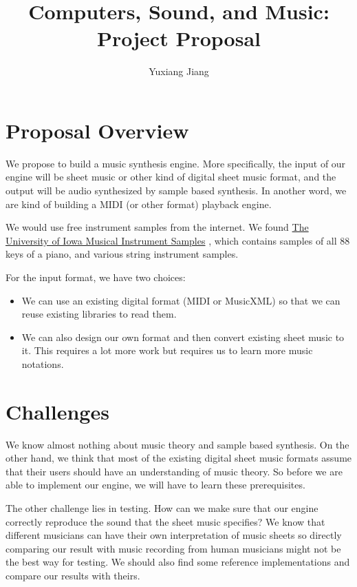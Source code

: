 \documentclass{article}
\begin{document}
\title{Computers, Sound, and Music: Project Proposal}
\author[]{Yuxiang Jiang}
\maketitle

\section{Proposal Overview}

We propose to build a music synthesis engine. More specifically, the input of
our engine will be sheet music or other kind of digital sheet music format,
and the output will be audio synthesized by sample based
synthesis. In another word, we are kind of building a MIDI (or other format)
playback engine.

We would use free instrument samples from the internet. We found
\href{http://theremin.music.uiowa.edu/MIS.html}
  {The University of Iowa Musical Instrument Samples}%
, which
contains samples of all 88 keys of a piano, and various string
instrument samples.

For the input format, we have two choices:
\begin{itemize}
  \item We can use an existing digital format (MIDI or MusicXML)
so that we can reuse existing libraries to read them.
\item We can also design our own format and then convert existing
sheet music to it. This requires a lot more work but requires us to
learn more music notations.
\end{itemize}

\section{Challenges}

We know almost nothing about music theory and sample based synthesis. On
the other hand, we think that most of the existing digital sheet music formats
assume that their users should have an understanding of music theory.
So before we are able to implement our engine, we will have to learn these
prerequisites.

The other challenge lies in testing. How can we make sure that our engine
correctly reproduce the sound that the sheet music specifies? We know that
different musicians can have their own interpretation of music sheets so
directly comparing our result with music recording from human musicians
might not be the best way for testing. We should also find some reference
implementations and compare our results with theirs.
\end{document}
